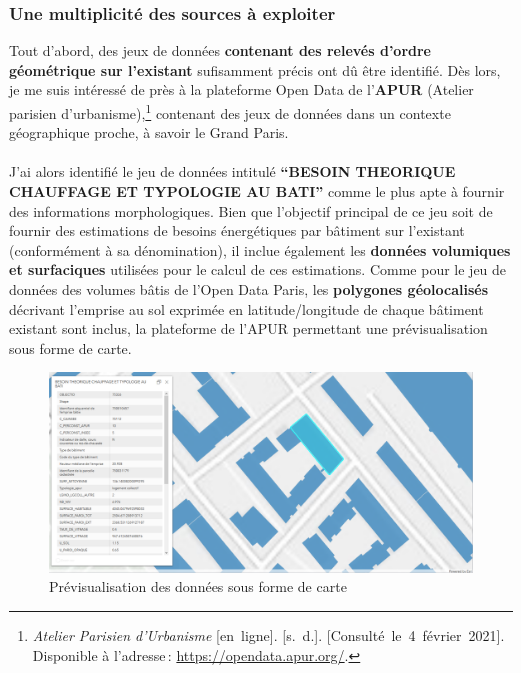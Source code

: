 \documentclass[
  11pt,
  french,
]{article}
\begin{document}
\hypertarget{une-multiplicituxe9-des-sources-uxe0-exploiter}{%
\subsubsection{Une multiplicité des sources à
exploiter}\label{une-multiplicituxe9-des-sources-uxe0-exploiter}}

Tout d'abord, des jeux de données \textbf{contenant des relevés d'ordre
géométrique sur l'existant} sufisamment précis ont dû être identifié.
Dès lors, je me suis intéressé de près à la plateforme Open Data de
l'\textbf{APUR} (Atelier parisien d'urbanisme),\footnote{\emph{Atelier
  Parisien d'Urbanisme} {[}en~ligne{]}. {[}s.~d.{]}.
  {[}Consulté~le~4~février~2021{]}. Disponible à l'adresse\,:
  \url{https://opendata.apur.org/}.} contenant des jeux de données dans
un contexte géographique proche, à savoir le Grand Paris.\\
~\\
J'ai alors identifié le jeu de données intitulé \textbf{``BESOIN
THEORIQUE CHAUFFAGE ET TYPOLOGIE AU BATI''} comme le plus apte à fournir
des informations morphologiques. Bien que l'objectif principal de ce jeu
soit de fournir des estimations de besoins énergétiques par bâtiment sur
l'existant (conformément à sa dénomination), il inclue également les
\textbf{données volumiques et surfaciques} utilisées pour le calcul de
ces estimations. Comme pour le jeu de données des volumes bâtis de
l'Open Data Paris, les \textbf{polygones géolocalisés} décrivant
l'emprise au sol exprimée en latitude/longitude de chaque bâtiment
existant sont inclus, la plateforme de l'APUR permettant une
prévisualisation sous forme de carte.

\begin{tcolorbox}
\begin{figure}

{\centering \includegraphics[width=0.9\linewidth]{__imgs/carte_apur} 

}

\caption[Prévisualisation des données sous forme de carte  -  \url{https://www.apur.org/open_data/}]{Prévisualisation des données sous forme de carte}\label{fig:carte_apur}
\end{figure}
\end{tcolorbox}
\end{document}
